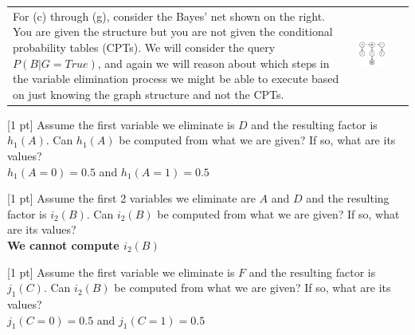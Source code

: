 \begin{tabular}{ll}
\begin{minipage}{0.7\textwidth}
For (c) through (g),  consider the Bayes' net shown on the right.  You are given
the structure but you are not given the
conditional probability tables (CPTs).  We will consider the query $P(B|G = True)$,
and again we will reason about which steps in the variable elimination process we might be able
to execute based on just knowing the graph structure and not the CPTs.
\end{minipage}
&
\begin{minipage}{0.25\textwidth}
\centering
    \includegraphics[width=0.6\textwidth]{figs/elimination2.pdf}
\end{minipage}
\\
\end{tabular}

\begin{question}{[1 pt]}
Assume the first variable we eliminate is $D$ and the resulting factor is $h_1(A)$. Can $h_1(A)$ be computed from what we are given? If so, what are its values?\\
\vspace{1.4cm} $h_1(A=0)=0.5$ and $h_1(A=1)=0.5$
\end{question}

\begin{question}{[1 pt]}
Assume the first 2 variables we eliminate are $A$ and $D$ and the resulting factor is $i_2(B)$. Can $i_2(B)$ be computed from what we are given? If so, what are its values?\\
\vspace{1.4cm} \textbf{We cannot compute $i_2(B)$}
\end{question}

\begin{question}{[1 pt]}
Assume the first variable we eliminate is $F$ and the resulting factor is $j_1(C)$. Can $i_2(B)$ be computed from what we are given? If so, what are its values?\\
\vspace{1.4cm} $j_1(C=0)=0.5$ and $j_1(C=1)=0.5$
\end{question}

